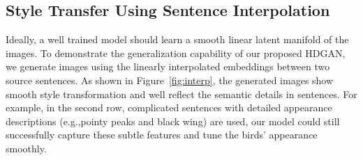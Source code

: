 \documentclass[10pt,twocolumn,letterpaper]{article}
\begin{document}
\subsection{Style Transfer Using Sentence Interpolation}
Ideally, a well trained model should learn a smooth linear latent manifold of the images. To demonstrate the generalization capability of our proposed HDGAN, we generate images using the linearly interpolated embeddings between two source sentences. 
As shown in Figure~\ref{fig:interp}, the generated images show smooth style transformation and well reflect the semantic details in sentences. 
For example, in the second row, complicated sentences with detailed appearance descriptions (e.g.,pointy peaks and black wing) are used, our model could still successfully capture these subtle features and tune the birds' appearance smoothly. 



\end{document}
